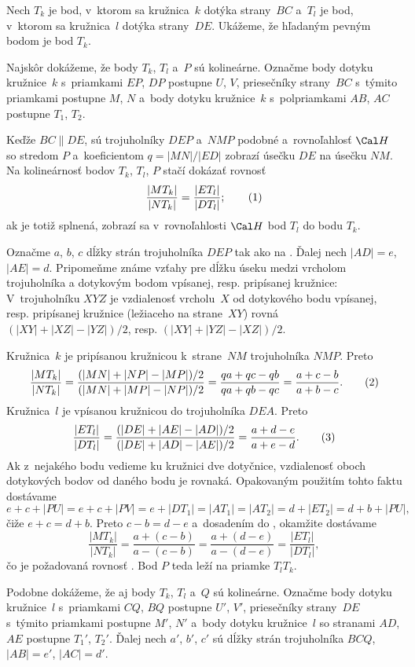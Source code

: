 {%
Nech $T_k$ je bod, v~ktorom sa kružnica~$k$ dotýka strany~$BC$ a~$T_l$ je bod, v~ktorom sa kružnica~$l$ dotýka strany~$DE$. Ukážeme, že hľadaným pevným bodom je bod $T_k$.

Najskôr dokážeme, že body $T_k$, $T_l$ a~$P$ sú kolineárne. Označme body dotyku kružnice~$k$ s~priamkami $EP$, $DP$ postupne $U$, $V$, priesečníky strany~$BC$ s~týmito priamkami postupne $M$, $N$ a~body dotyku kružnice~$k$ s~polpriamkami $AB$, $AC$ postupne $T_1$, $T_2$.
%

Keďže $BC\parallel DE$, sú trojuholníky $DEP$ a~$NMP$ podobné a~rovnoľahlosť $\Cal H$ so stredom $P$ a~koeficientom $q=|MN|/|ED|$ zobrazí úsečku $DE$ na úsečku $NM$. Na kolineárnosť bodov $T_k$, $T_l$, $P$ stačí dokázať rovnosť
$$
\frac{|MT_k|}{|NT_k|}=\frac{|ET_l|}{|DT_l|};
\tag1
$$
ak je totiž splnená, zobrazí sa v~rovnoľahlosti $\Cal H$ bod $T_l$ do bodu $T_k$.

Označme $a$, $b$, $c$ dĺžky strán trojuholníka $DEP$ tak ako na \obr. Ďalej nech $|AD|=e$, $|AE|=d$. Pripomeňme známe vzťahy pre dĺžku úseku medzi vrcholom trojuholníka a dotykovým bodom vpísanej, resp. pripísanej kružnice: V~trojuholníku $XYZ$ je vzdialenosť vrcholu~$X$ od dotykového bodu vpísanej, resp. pripísanej kružnice (ležiaceho na strane~$XY$) rovná $(|XY|+|XZ|-|YZ|)/2$, resp. $(|XY|+|YZ|-|XZ|)/2$.

Kružnica~$k$ je pripísanou kružnicou k~strane~$NM$ trojuholníka $NMP$. Preto
$$
\frac{|MT_k|}{|NT_k|}=\frac{(|MN|+|NP|-|MP|)/2}{(|MN|+|MP|-|NP|)/2}=\frac{qa+qc-qb}{qa+qb-qc}=\frac{a+c-b}{a+b-c}.
\tag2
$$
Kružnica~$l$ je vpísanou kružnicou do trojuholníka $DEA$. Preto
$$
\frac{|ET_l|}{|DT_l|}=\frac{(|DE|+|AE|-|AD|)/2}{(|DE|+|AD|-|AE|)/2}=\frac{a+d-e}{a+e-d}.
\tag3
$$
Ak z~nejakého bodu vedieme ku kružnici dve dotyčnice, vzdialenosť oboch dotykových bodov od daného bodu je rovnaká. Opakovaným použitím tohto faktu dostávame
$$
e+c+|PU|=e+c+|PV|=e+|DT_1|=|AT_1|=|AT_2|=d+|ET_2|=d+b+|PU|,
$$
čiže $e+c=d+b$. Preto $c-b=d-e$ a~dosadením do ,  okamžite dostávame
$$
\frac{|MT_k|}{|NT_k|}=\frac{a+(c-b)}{a-(c-b)}=\frac{a+(d-e)}{a-(d-e)}=\frac{|ET_l|}{|DT_l|},
$$
čo je požadovaná rovnosť . Bod $P$ teda leží na priamke $T_lT_k$.

\smallskip
Podobne dokážeme, že aj body $T_k$, $T_l$ a~$Q$ sú kolineárne. Označme body dotyku kružnice~$l$ s~priamkami $CQ$, $BQ$ postupne $U'$, $V'$, priesečníky strany~$DE$ s~týmito priamkami postupne $M'$, $N'$ a~body dotyku kružnice~$l$ so stranami $AD$, $AE$ postupne $T_1'$, $T_2'$. Ďalej nech $a'$, $b'$, $c'$ sú dĺžky strán trojuholníka $BCQ$, $|AB|=e'$, $|AC|=d'$.
%

}
